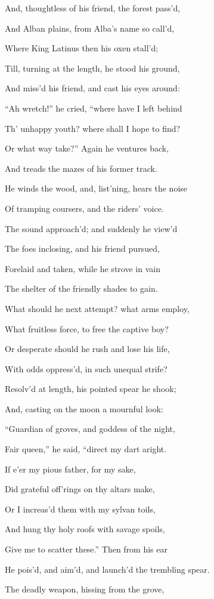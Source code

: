 And, thoughtless of his friend, the forest pass’d,

And Alban plains, from Alba’s name so call’d,

Where King Latinus then his oxen stall’d;

Till, turning at the length, he stood his ground,

And miss’d his friend, and cast his eyes around:

“Ah wretch!” he cried, “where have I left behind

Th’ unhappy youth? where shall I hope to find?

Or what way take?” Again he ventures back,

And treads the mazes of his former track.

He winds the wood, and, list’ning, hears the noise

Of tramping coursers, and the riders’ voice.

The sound approach’d; and suddenly he view’d

The foes inclosing, and his friend pursued,

Forelaid and taken, while he strove in vain

The shelter of the friendly shades to gain.

What should he next attempt? what arms employ,

What fruitless force, to free the captive boy?

Or desperate should he rush and lose his life,

With odds oppress’d, in such unequal strife?

Resolv’d at length, his pointed spear he shook;

And, casting on the moon a mournful look:

“Guardian of groves, and goddess of the night,

Fair queen,” he said, “direct my dart aright.

If e’er my pious father, for my sake,

Did grateful off’rings on thy altars make,

Or I increas’d them with my sylvan toils,

And hung thy holy roofs with savage spoils,

Give me to scatter these.” Then from his ear

He pois’d, and aim’d, and launch’d the trembling spear.

The deadly weapon, hissing from the grove,

